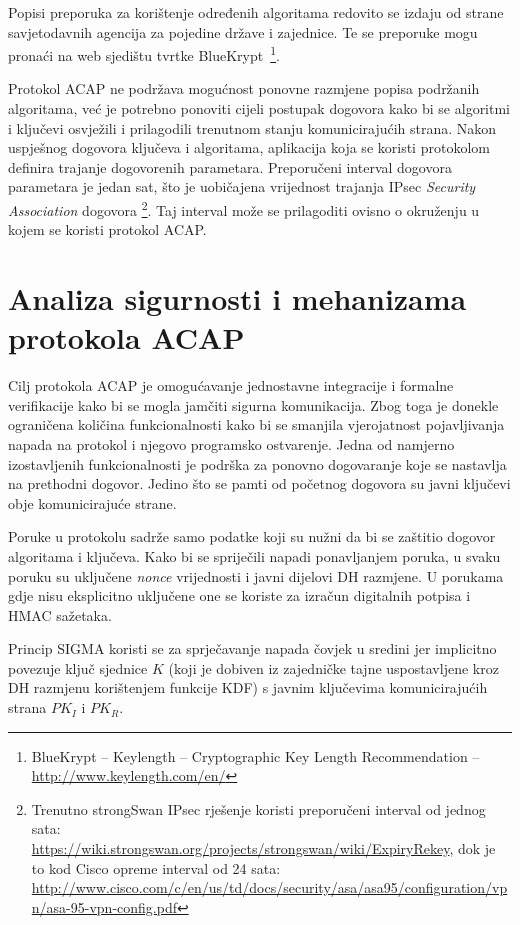 Popisi preporuka za korištenje određenih algoritama redovito se izdaju od strane
savjetodavnih agencija za pojedine države i zajednice. Te se preporuke mogu
pronaći na web sjedištu tvrtke BlueKrypt~\footnote{BlueKrypt -- Keylength --
Cryptographic Key Length Recommendation -- \url{http://www.keylength.com/en/}}.

Protokol ACAP ne podržava mogućnost ponovne razmjene popisa
podržanih algoritama, već je potrebno ponoviti cijeli postupak dogovora kako bi
se algoritmi i ključevi osvježili i prilagodili trenutnom stanju komunicirajućih
strana. Nakon uspješnog dogovora ključeva i algoritama, aplikacija
koja se koristi protokolom definira trajanje dogovorenih parametara.
Preporučeni interval dogovora parametara je jedan sat, što je uobičajena
vrijednost trajanja IPsec \emph{Security Association} dogovora
\footnote{Trenutno strongSwan IPsec rješenje koristi preporučeni interval
od jednog sata: \\
\url{https://wiki.strongswan.org/projects/strongswan/wiki/ExpiryRekey}, dok je to kod
Cisco opreme interval od 24 sata:
\url{http://www.cisco.com/c/en/us/td/docs/security/asa/asa95/configuration/vpn/asa-95-vpn-config.pdf}}.
Taj interval može se prilagoditi ovisno o okruženju u kojem se koristi
protokol ACAP.

\section{Analiza sigurnosti i mehanizama protokola ACAP}
\label{sec:sigurnost}

Cilj protokola ACAP je omogućavanje jednostavne integracije i formalne
verifikacije kako bi se mogla jamčiti sigurna komunikacija. Zbog toga je
donekle ograničena količina funkcionalnosti kako bi se smanjila vjerojatnost
pojavljivanja napada na protokol i njegovo programsko ostvarenje.
Jedna od namjerno izostavljenih
funkcionalnosti je podrška za ponovno dogovaranje koje se nastavlja na
prethodni dogovor.  Jedino što se pamti od početnog dogovora su javni ključevi
obje komunicirajuće strane.

Poruke u protokolu sadrže samo podatke koji su nužni da bi se zaštitio dogovor
algoritama i ključeva. Kako bi se spriječili napadi ponavljanjem poruka, u svaku
poruku su uključene \emph{nonce} vrijednosti i javni dijelovi DH
razmjene. U porukama gdje nisu eksplicitno uključene one se koriste za izračun
digitalnih potpisa i HMAC sažetaka.

Princip SIGMA \cite{Krawczyk2003sigma} koristi se za sprječavanje napada
čovjek u sredini jer implicitno povezuje ključ sjednice $K$ (koji je dobiven
iz zajedničke tajne uspostavljene kroz DH razmjenu korištenjem funkcije KDF) s
javnim ključevima komunicirajućih strana $PK_I$ i $PK_R$.

